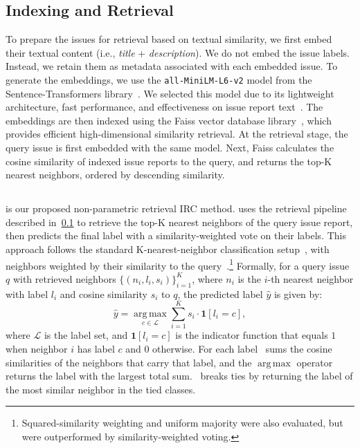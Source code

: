 \subsection{Indexing and Retrieval}
\label{sec:retrieval}
To prepare the issues for retrieval based on textual similarity, we first embed their textual content (i.e., \textit{title} + \textit{description}). We do not embed the issue labels. Instead, we retain them as metadata associated with each embedded issue. To generate the embeddings, we use the \texttt{all-MiniLM-L6-v2} model from the Sentence-Transformers library~\cite{reimers2019sentence}. We selected this model due to its lightweight architecture, fast performance, and effectiveness on issue report text~\cite{huang2025back}. The embeddings are then indexed using the Faiss vector database library~\cite{douze2025faiss}, which provides efficient high-dimensional similarity retrieval. At the retrieval stage, the query issue is first embedded with the same model. Next, Faiss calculates the cosine similarity of indexed issue reports to the query, and returns the top-K nearest neighbors, ordered by descending similarity.


\subsection{\votag}
\label{sec:approach-votag}
\votag is our proposed non-parametric retrieval IRC method. \votag uses the retrieval pipeline described in~\cref{sec:retrieval} to retrieve the top-K nearest neighbors of the query issue report, then predicts the final
label with a similarity-weighted vote on their labels. This approach follows the standard K-nearest-neighbor classification setup~\cite{cover1967nearest}, with neighbors weighted by their similarity to the query~\cite{dudani1976distance}.\footnote{Squared-similarity weighting and uniform majority were also evaluated, but were outperformed by similarity-weighted voting.} Formally, for a
query issue $q$ with retrieved neighbors $\{(n_i, l_i, s_i)\}_{i=1}^{K}$, where
$n_i$ is the $i$-th nearest neighbor with label $l_i$ and cosine similarity $s_i$ to $q$, the predicted label $\hat{y}$ is given by:
\begin{equation}
    \hat{y} = \operatorname*{arg\,max}_{c \in \mathcal{L}}
    \sum_{i=1}^{K} s_i \cdot \mathbf{1}[l_i = c],
    \label{eq:votag}
\end{equation}
where $\mathcal{L}$ is the label set, and $\mathbf{1}[l_i = c]$ is the indicator function that equals $1$ when neighbor $i$ has label $c$ and $0$ otherwise. For each label \votag\ sums the cosine similarities of the neighbors that carry that label, and the $\operatorname*{arg\,max}$ operator returns the label with the largest total sum. \votag\ breaks ties by returning the label of the most similar neighbor in the tied classes.



